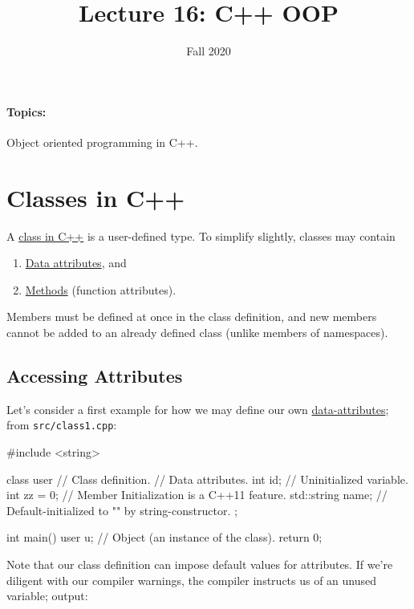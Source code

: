 \documentclass[12pt,letterpaper,twoside]{article}
\begin{document}
\title{Lecture 16: C++ OOP\vspace{-5ex}}
\date{Fall 2020}
\maketitle

{\footnotesize
\paragraph{Topics:} Object oriented programming in C++.
}
\vspace{-3ex}

\section{Classes in C++}
A \href{https://en.cppreference.com/w/cpp/language/classes}{class in C++} 
is a user-defined type. To simplify slightly, classes may contain
\begin{enumerate}   \item \href{https://en.cppreference.com/w/cpp/language/data_members}{Data attributes}, and
  \item \href{https://en.cppreference.com/w/cpp/language/member_functions}
    {Methods} (function attributes).
\end{enumerate}

Members must be defined at once in the class definition, and new members cannot
be added to an already defined class (unlike members of namespaces). 

\subsection{Accessing Attributes}
Let's consider a first example for how we may define our own 
\href{https://en.cppreference.com/w/cpp/language/data_members}
{data-attributes};
from \texttt{src/class1.cpp}:

\begin{cpp}
#include <string>

class user {           // Class definition.
  // Data attributes.
  int id;              // Uninitialized variable.
  int zz = 0;          // Member Initialization is a C++11 feature.
  std::string name;    // Default-initialized to "" by string-constructor.
};

int main() {
  user u;              // Object (an instance of the class).
  return 0;
}
\end{cpp}

Note that our class definition can impose default values for attributes.
If we're diligent with our compiler warnings, the compiler instructs us of 
an unused variable; output:
\end{document}
